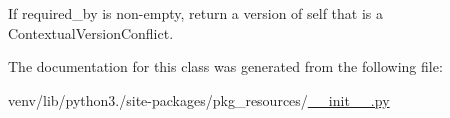 \begin{DoxyVerb}If required_by is non-empty, return a version of self that is a
ContextualVersionConflict.
\end{DoxyVerb}
 

The documentation for this class was generated from the following file\+:\begin{DoxyCompactItemize}
\item 
venv/lib/python3./site-\/packages/pkg\+\_\+resources/\hyperlink{venv_2lib_2python3_89_2site-packages_2pkg__resources_2____init_____8py}{\+\_\+\+\_\+init\+\_\+\+\_\+.\+py}\end{DoxyCompactItemize}
